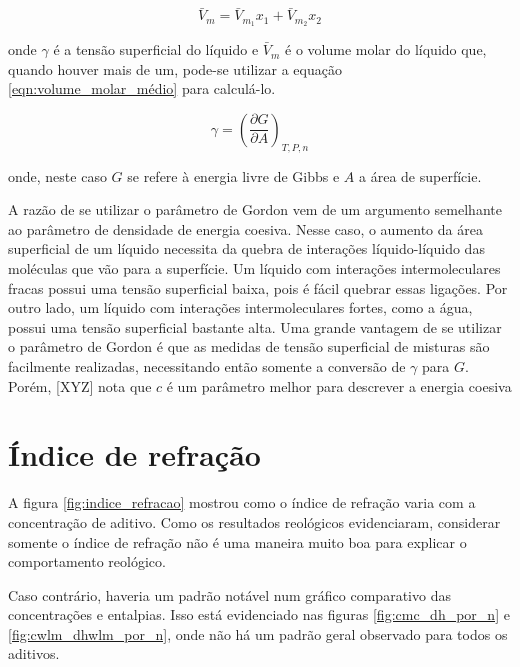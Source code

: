 		\begin{equation}
			\bar{V}_m = \bar{V}_{m_{1}}x_1 + \bar{V}_{m_{2}}x_2
			\label{eqn:volume_molar_médio}
		\end{equation}
		
		\noindent onde \(\gamma\) é a tensão superficial do líquido e \(\bar{V}_m\) é o volume molar do líquido que, quando houver mais de um, pode-se utilizar a equação \ref{eqn:volume_molar_médio} para calculá-lo.
		
		\begin{equation}
		\gamma = \left( \dfrac{\partial G}{\partial A}  \right)_{T,P,n}
		\label{eqn:tens_superficial}
		\end{equation}
		
		\noindent onde, neste caso \(G\) se refere à energia livre de Gibbs e \(A\) a área de superfície.
		
		A razão de se utilizar o parâmetro de Gordon vem de um argumento semelhante ao parâmetro de densidade de energia coesiva. Nesse caso, o aumento da área superficial de um líquido necessita da quebra de interações líquido-líquido das moléculas que vão para a superfície. Um líquido com interações intermoleculares fracas possui uma tensão superficial baixa, pois é fácil quebrar essas ligações. Por outro lado, um líquido com interações intermoleculares fortes, como a água, possui uma tensão superficial bastante alta. Uma grande vantagem de se utilizar o parâmetro de Gordon é que as medidas de tensão superficial de misturas são facilmente realizadas, necessitando então somente a conversão de \(\gamma\) para \(G\). Porém, [XYZ] nota que \(c\) é um parâmetro melhor para descrever a energia coesiva %
	

		\section{Índice de refração}
		
		A figura \ref{fig:indice_refracao} mostrou como o índice de refração varia com a concentração de aditivo. Como os resultados reológicos evidenciaram, considerar somente o índice de refração não é uma maneira muito boa para explicar o comportamento reológico.
		
		Caso contrário, haveria um padrão notável num gráfico comparativo das concentrações e entalpias. Isso está evidenciado nas figuras \ref{fig:cmc_dh_por_n} e \ref{fig:cwlm_dhwlm_por_n}, onde não há um padrão geral observado para todos os aditivos.
		
